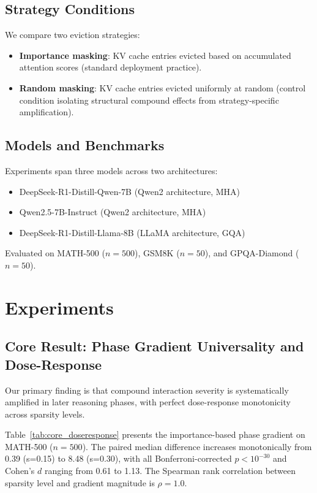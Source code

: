 \documentclass[11pt,a4paper]{article}
\begin{document}
\subsection{Strategy Conditions}

We compare two eviction strategies:
\begin{itemize}
\item \textbf{Importance masking}: KV cache entries evicted based on accumulated attention scores (standard deployment practice).
\item \textbf{Random masking}: KV cache entries evicted uniformly at random (control condition isolating structural compound effects from strategy-specific amplification).
\end{itemize}

\subsection{Models and Benchmarks}

Experiments span three models across two architectures:
\begin{itemize}
\item DeepSeek-R1-Distill-Qwen-7B (Qwen2 architecture, MHA)
\item Qwen2.5-7B-Instruct (Qwen2 architecture, MHA)
\item DeepSeek-R1-Distill-Llama-8B (LLaMA architecture, GQA)
\end{itemize}
Evaluated on MATH-500 ($n = 500$), GSM8K ($n = 50$), and GPQA-Diamond ($n = 50$).

\section{Experiments}

\subsection{Core Result: Phase Gradient Universality and Dose-Response}
\label{sec:core}

Our primary finding is that compound interaction severity is systematically amplified in later reasoning phases, with perfect dose-response monotonicity across sparsity levels.

Table~\ref{tab:core_doseresponse} presents the importance-based phase gradient on MATH-500 ($n = 500$). The paired median difference increases monotonically from 0.39 (s=0.15) to 8.48 (s=0.30), with all Bonferroni-corrected $p < 10^{-30}$ and Cohen's $d$ ranging from 0.61 to 1.13. The Spearman rank correlation between sparsity level and gradient magnitude is $\rho = 1.0$.
\end{document}
